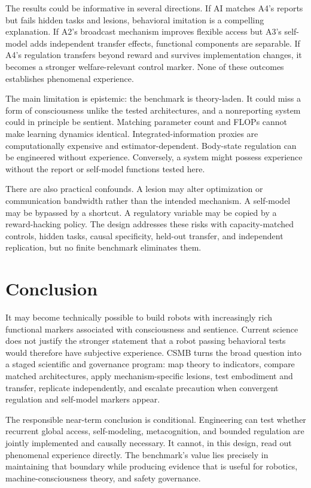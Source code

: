 \documentclass[conference]{IEEEtran}
\begin{document}
The results could be informative in several directions. If AI matches A4's reports but fails hidden tasks and lesions, behavioral imitation is a compelling explanation. If A2's broadcast mechanism improves flexible access but A3's self-model adds independent transfer effects, functional components are separable. If A4's regulation transfers beyond reward and survives implementation changes, it becomes a stronger welfare-relevant control marker. None of these outcomes establishes phenomenal experience.

The main limitation is epistemic: the benchmark is theory-laden. It could miss a form of consciousness unlike the tested architectures, and a nonreporting system could in principle be sentient. Matching parameter count and FLOPs cannot make learning dynamics identical. Integrated-information proxies are computationally expensive and estimator-dependent. Body-state regulation can be engineered without experience. Conversely, a system might possess experience without the report or self-model functions tested here.

There are also practical confounds. A lesion may alter optimization or communication bandwidth rather than the intended mechanism. A self-model may be bypassed by a shortcut. A regulatory variable may be copied by a reward-hacking policy. The design addresses these risks with capacity-matched controls, hidden tasks, causal specificity, held-out transfer, and independent replication, but no finite benchmark eliminates them.

\section{Conclusion}

It may become technically possible to build robots with increasingly rich functional markers associated with consciousness and sentience. Current science does not justify the stronger statement that a robot passing behavioral tests would therefore have subjective experience. CSMB turns the broad question into a staged scientific and governance program: map theory to indicators, compare matched architectures, apply mechanism-specific lesions, test embodiment and transfer, replicate independently, and escalate precaution when convergent regulation and self-model markers appear.

The responsible near-term conclusion is conditional. Engineering can test whether recurrent global access, self-modeling, metacognition, and bounded regulation are jointly implemented and causally necessary. It cannot, in this design, read out phenomenal experience directly. The benchmark's value lies precisely in maintaining that boundary while producing evidence that is useful for robotics, machine-consciousness theory, and safety governance.
\end{document}
